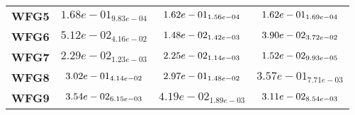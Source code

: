 \documentclass{article}
\begin{document}
\begin{table}[!htp]
\begin{scriptsize}
\begin{tabular}{c|ccc}
      \textbf{WFG5} & $1.68e-01_{9.83e-04} $ & $ \cellcolor{gray95} 1.62e-01_{1.56e-04} $ & $ \cellcolor{gray25} 1.62e-01_{1.69e-04}$ \\
      \textbf{WFG6} & $5.12e-02_{4.16e-02} $ & $ \cellcolor{gray95} 1.48e-02_{1.42e-03} $ & $ \cellcolor{gray25} 3.90e-02_{3.72e-02}$ \\
      \textbf{WFG7} & $2.29e-02_{1.23e-03} $ & $ \cellcolor{gray25} 2.25e-02_{1.14e-03} $ & $ \cellcolor{gray95} 1.52e-02_{9.93e-05}$ \\
      \textbf{WFG8} & $\cellcolor{gray25} 3.02e-01_{4.14e-02} $ & $ \cellcolor{gray95} 2.97e-01_{1.48e-02} $ & $ 3.57e-01_{7.71e-03}$ \\
      \textbf{WFG9} & $\cellcolor{gray25} 3.54e-02_{6.15e-03} $ & $ 4.19e-02_{1.89e-03} $ & $ \cellcolor{gray95} 3.11e-02_{8.54e-03}$ \\
  \end{tabular}
  \end{scriptsize}
\end{table}
\end{document}
